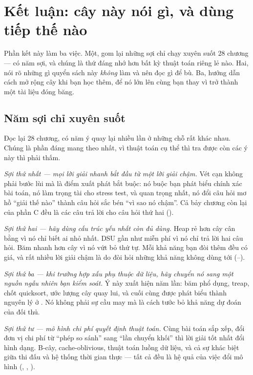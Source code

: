 \documentclass[algorithm.tex]{subfiles}
\begin{document}
\chapter*{Kết luận: cây này nói gì, và dùng tiếp thế nào}

\begin{tomtat}
Phần kết này làm ba việc. Một, gom lại những sợi chỉ chạy xuyên suốt 28 chương --- có năm sợi, và chúng là thứ đáng nhớ hơn bất kỳ thuật toán riêng lẻ nào. Hai, nói rõ những gì quyển sách này \emph{không} làm và nên đọc gì để bù. Ba, hướng dẫn cách mở rộng cây khi bạn học thêm, để nó lớn lên cùng bạn thay vì trở thành một tài liệu đóng băng.
\end{tomtat}

\section*{Năm sợi chỉ xuyên suốt}

Đọc lại 28 chương, có năm ý quay lại nhiều lần ở những chỗ rất khác nhau. Chúng là phần đáng mang theo nhất, vì thuật toán cụ thể thì tra được còn các ý này thì phải thấm.

\emph{Sợi thứ nhất --- mọi lời giải nhanh bắt đầu từ một lời giải chậm.} Vét cạn không phải bước lùi mà là điểm xuất phát bắt buộc: nó buộc bạn phát biểu chính xác bài toán, nó làm trọng tài cho stress test, và quan trọng nhất, nó đổi câu hỏi mơ hồ ``giải thế nào'' thành câu hỏi sắc bén ``vì sao nó chậm''. Cả bảy chương còn lại của phần C đều là các câu trả lời cho câu hỏi thứ hai ().

\emph{Sợi thứ hai --- hãy dùng cấu trúc yếu nhất còn đủ dùng.} Heap rẻ hơn cây cân bằng vì nó chỉ biết ai nhỏ nhất. DSU gần như miễn phí vì nó chỉ trả lời hai câu hỏi. Băm nhanh hơn cây vì nó vứt bỏ thứ tự. Mỗi khả năng bạn đòi thêm đều có giá, và rất nhiều lời giải chậm là do đòi hỏi những khả năng không dùng tới (--).

\emph{Sợi thứ ba --- khi trường hợp xấu phụ thuộc dữ liệu, hãy chuyển nó sang một nguồn ngẫu nhiên bạn kiểm soát.} Ý này xuất hiện năm lần: băm phổ dụng, treap, chốt quicksort, ước lượng cây quay lui, và cuối cùng được phát biểu thành nguyên lý ở . Nó không phải sự cầu may mà là cách tước bỏ khả năng dự đoán của đối thủ.

\emph{Sợi thứ tư --- mô hình chi phí quyết định thuật toán.} Cùng bài toán sắp xếp, đổi đơn vị chi phí từ ``phép so sánh'' sang ``lần chuyển khối'' thì lời giải tốt nhất đổi hình dạng. B-cây, cache-oblivious, thuật toán luồng dữ liệu, và cả sự khác biệt giữa thi đấu và hệ thống thời gian thực --- tất cả đều là hệ quả của việc đổi mô hình (, , ).
\end{document}
